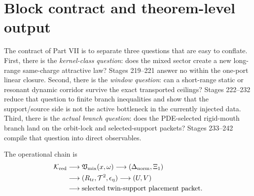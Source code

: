 
\section{Block contract and theorem-level output}
\label{sec:part07-block-contract}

The contract of Part VII is to separate three questions that are easy to conflate.  First, there is the \emph{kernel-class question}: does the mixed sector create a new long-range same-charge attractive law?  Stages 219--221 answer no within the one-port linear closure.  Second, there is the \emph{window question}: can a short-range static or resonant dynamic corridor survive the exact transported ceilings?  Stages 222--232 reduce that question to finite branch inequalities and show that the support/source side is not the active bottleneck in the currently injected data.  Third, there is the \emph{actual branch question}: does the PDE-selected rigid-mouth branch land on the orbit-lock and selected-support packets?  Stages 233--242 compile that question into direct observables.

The operational chain is
\begin{equation}
\label{eq:part07-operational-chain}
\begin{aligned}
\mathcal K_{\rm red}
&\longrightarrow
\mathfrak V_{\rm mix}(x,\omega)
\longrightarrow
(\Delta_{\rm norm},\Xi_1)
\\
&\longrightarrow
(R_{\rm tr},\mathcal T^2,\epsilon_\eta)
\longrightarrow
(U,V)
\\
&\longrightarrow
\text{selected twin-support placement packet}.
\end{aligned}
\end{equation}

